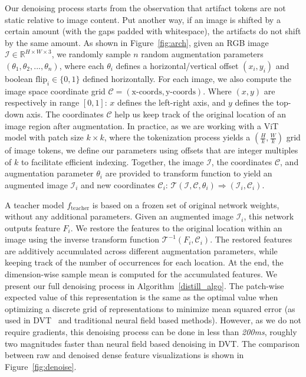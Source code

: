 Our denoising process starts from the observation that artifact tokens are not static relative to image content. Put another way, if an image is shifted by a certain amount (with the gaps padded with whitespace), the artifacts do not shift by the same amount. As shown in Figure~\ref{fig:arch}, given an RGB image $\mathcal{I}\in\mathbb{R}^{H\times W \times 3}$, we randomly sample $n$ random augmentation parameters $(\theta_1, \theta_2, ...,\theta_n)$, where each $\theta_i$ defines a horizontal/vertical offset $(x_i,y_i)$ and boolean $\text{flip}_i \in \{0,1\}$ defined horizontally. For each image, we also compute the image space coordinate grid $\mathcal{C} = (\text{x-coords},\text{y-coords})$. Where $(x,y)$ are respectively in range $[0,1]$: $x$ defines the left-right axis, and $y$ defines the top-down axis. The coordinates $\mathcal{C}$ help us keep track of the original location of an image region after augmentation. In practice, as we are working with a ViT model with patch size $k\times k$, where the tokenization process yields a $(\frac{H}{k},\frac{W}{k})$ grid of image tokens, we define our parameters using offsets that are integer multiples of $k$ to facilitate efficient indexing.
Together, the image $\mathcal{I}$, the coordinates $\mathcal{C}$, and augmentation parameter $\theta_i$ are provided to transform function to yield an augmented image $\mathcal{I}_i$ and new coordinates $\mathcal{C}_i$: $\mathcal{T}(\mathcal{I}, \mathcal{C},\theta_i) \Rightarrow (\mathcal{I}_i,\mathcal{C}_i)$. 



A teacher model $f_\text{teacher}$ is based on a frozen set of original network weights, without any additional parameters. Given an augmented image $\mathcal{I}_i$, this network outputs feature $F_i$. We restore the features to the original location within an image using the inverse transform function $\mathcal{T}^{-1}(F_i, \mathcal{C}_i)$. The restored features are additively accumulated across different augmentation parameters, while keeping track of the number of occurrences for each location. At the end, the dimension-wise sample mean is computed for the accumulated features. We present our full denoising process in Algorithm~\ref{distill_algo}.
The patch-wise expected value of this representation is the same as the optimal value when optimizing a discrete grid of representations to minimize mean squared error (as used in DVT~\citep{yang2024denoising} and traditional neural field based methods). However, as we do not require gradients, this denoising process can be done in less than \textit{200ms}, roughly two magnitudes faster than neural field based denoising in DVT. The comparison between raw and denoised dense feature visualizations is shown in Figure~\ref{fig:denoise}.


